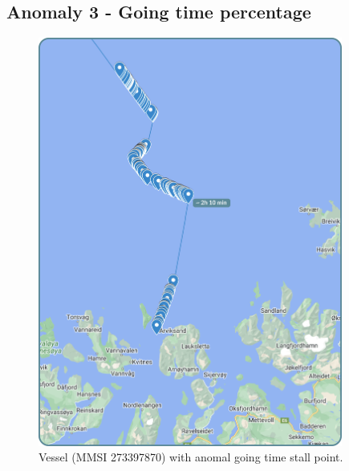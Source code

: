 \subsection{Anomaly 3 - Going time percentage}
\label{sec:anomaly-3}

\begin{figure}[H]
    \centering
    \includegraphics[width=10cm]{Images/3/anomaly-3.png}
    \caption{Vessel (MMSI 273397870) with anomal going time stall point.}
\end{figure}
